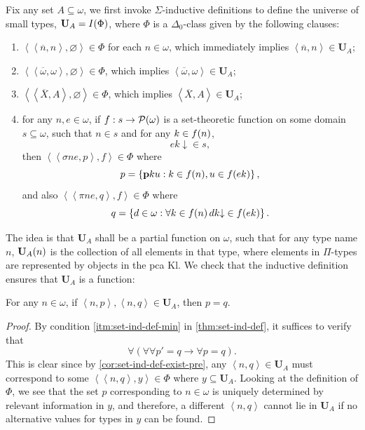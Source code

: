 \documentclass[12pt,openany]{book}
\theoremstyle{plain}
\theoremstyle{definition}
\newcommand\uplabel[1]{\textup{(#1)}}
\newcommand\tuple[1]{\left\langle #1 \right\rangle}
\newcommand\opA[1]{\mathop{\forall #1}}
\newcommand\Pow{\mathcal{P}}
\newcommand\KP{\mathrm{KP}}
\newcommand\Kl{\mathrm{Kl}}
\newcommand\bp{\mathbf{p}}
\newcommand\bU{\mathbf{U}}
\begin{document}
Fix any set $A \subseteq \omega$, we first invoke $\Sigma$-inductive definitions to define the universe of small types, $\bU_A = I\mleft(\Phi\mright)$, where $\Phi$ is a $\Delta_0$-class given by the following clauses:
\begin{enumerate}[label=\uplabel{\arabic*}]
  \item $\tuple{\tuple{\overline{n}, n}, \varnothing} \in \Phi$ for each $n \in \omega$, which immediately implies $\tuple{\overline{n}, n} \in \bU_A$;
  \item $\tuple{\tuple{\overline{\omega}, \omega}, \varnothing} \in \Phi$, which implies $\tuple{\overline{\omega}, \omega} \in \bU_A$;
  \item $\tuple{\tuple{\overline{X}, A}, \varnothing} \in \Phi$, which implies $\tuple{\overline{X}, A} \in \bU_A$;
  \item for any $n, e \in \omega$, if $f : s \rightarrow \Pow\mleft(\omega\mright)$ is a set-theoretic function on some domain $s \subseteq \omega$, such that $n \in s$ and for any $k \in f\mleft(n\mright)$,
        \[ek {\downarrow} \in s,\]
        then $\tuple{\tuple{\sigma ne, p}, f} \in \Phi$ where
        \[p = \left\{\bp ku : k \in f\mleft(n\mright), u \in f\mleft(ek\mright)\right\},\]
        and also $\tuple{\tuple{\pi ne, q}, f} \in \Phi$ where
        \[q = \left\{d \in \omega : \opA{k \in f\mleft(n\mright)} dk {\downarrow} \in f\mleft(ek\mright)\right\}.\]
\end{enumerate}

The idea is that $\bU_A$ shall be a partial function on $\omega$, such that for any type name $n$, $\bU_A\mleft(n\mright)$ is the collection of all elements in that type, where elements in $\Pi$-types are represented by objects in the pca $\Kl$. We check that the inductive definition ensures that $\bU_A$ is a function:
\begin{lemma}[$\KP$]
  \label{lem:mltt-ind-def-func}
  For any $n \in \omega$, if $\tuple{n, p}, \tuple{n, q} \in \bU_A$, then $p = q$.
\end{lemma}

\begin{proof}
  By condition \ref{itm:set-ind-def-min} in \autoref{thm:set-ind-def}, it suffices to verify that
  \[\opA{{\tuple{\tuple{n, p}, y} \in \Phi}} \left(\opA{{\tuple{m, p'} \in y}} \opA{{\tuple{m, q} \in \bU_A}} p' = q \rightarrow \opA{{\tuple{n, q} \in \bU_A}} p = q\right).\]
  This is clear since by \autoref{cor:set-ind-def-exist-pre}, any $\tuple{n, q} \in \bU_A$ must correspond to some $\tuple{\tuple{n, q}, y} \in \Phi$ where $y \subseteq \bU_A$. Looking at the definition of $\Phi$, we see that the set $p$ corresponding to $n \in \omega$ is uniquely determined by relevant information in $y$, and therefore, a different $\tuple{n, q}$ cannot lie in $\bU_A$ if no alternative values for types in $y$ can be found.
\end{proof}
\end{document}
